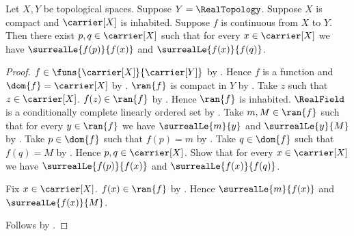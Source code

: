 \begin{theorem}\label{continuous_real_map_attains_extrema}
    Let $X,Y$ be topological spaces.
    Suppose $Y=\RealTopology$.
    Suppose $X$ is compact and $\carrier[X]$ is inhabited.
    Suppose $f$ is continuous from $X$ to $Y$.
    Then there exist $p,q\in\carrier[X]$ such that for every
        $x\in\carrier[X]$ we have
        $\surrealLe{f(p)}{f(x)}$ and $\surrealLe{f(x)}{f(q)}$.
\end{theorem}
\begin{proof}
    $f\in\funs{\carrier[X]}{\carrier[Y]}$ by
        .
    Hence $f$ is a function and $\dom{f}=\carrier[X]$ by
        .
    $\ran{f}$ is compact in $Y$ by
        .
    Take $z$ such that $z\in\carrier[X]$.
    $f(z)\in\ran{f}$ by .
    Hence $\ran{f}$ is inhabited.
    $\RealField$ is a conditionally complete linearly ordered set by
        .
    Take $m,M\in\ran{f}$ such that for every $y\in\ran{f}$ we have
        $\surrealLe{m}{y}$ and $\surrealLe{y}{M}$ by
        .
    Take $p\in\dom{f}$ such that $f(p)=m$ by
        .
    Take $q\in\dom{f}$ such that $f(q)=M$ by
        .
    Hence $p,q\in\carrier[X]$.
    Show that for every $x\in\carrier[X]$ we have
        $\surrealLe{f(p)}{f(x)}$ and $\surrealLe{f(x)}{f(q)}$.
    \begin{subproof}
        Fix $x\in\carrier[X]$.
        $f(x)\in\ran{f}$ by .
        Hence $\surrealLe{m}{f(x)}$ and $\surrealLe{f(x)}{M}$.
    \end{subproof}
    Follows by \auto.
\end{proof}
